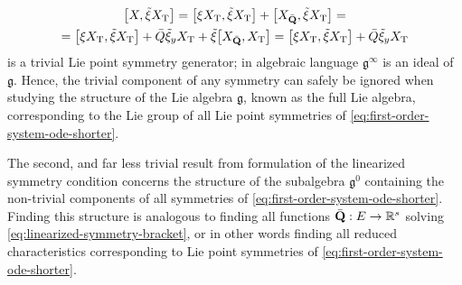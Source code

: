 \begin{multline}
  \comm{X}{\tilde{\xi} X_{\text{T}}} =
  \comm{\xi X_{\text{T}}}{\tilde{\xi} X_{\text{T}}} + \comm{X_{\bar{\vb{Q}}}}{\tilde{\xi} X_{\text{T}}} =\\
  = \comm{\xi X_{\text{T}}}{\tilde{\xi} X_{\text{T}}} + \bar{Q} \tilde{\xi}_y X_{\text{T}} + \tilde{\xi} \comm{X_{\bar{\vb{Q}}}}{X_{\text{T}}} =
  \comm{\xi X_{\text{T}}}{\tilde{\xi} X_{\text{T}}} + \bar{Q} \tilde{\xi}_y X_{\text{T}}
\end{multline}
is a trivial Lie point symmetry generator; in algebraic language \(\mathfrak{g}^\infty\) is an ideal of \(\mathfrak{g}\).
Hence, the trivial component of any symmetry can safely be ignored when studying the structure of the Lie algebra \(\mathfrak{g}\), known as the full Lie algebra, corresponding to the Lie group of all Lie point symmetries of \cref{eq:first-order-system-ode-shorter}.

The second, and far less trivial result from formulation  of the linearized symmetry condition concerns the structure of the subalgebra \(\mathfrak{g}^0\) containing the non-trivial components of all symmetries of \cref{eq:first-order-system-ode-shorter}.
Finding this structure is analogous to finding all functions \(\bar{\vb{Q}}: E \to \mathbb{R}^s\) solving \cref{eq:linearized-symmetry-bracket}, or in other words finding all reduced characteristics corresponding to Lie point symmetries of \cref{eq:first-order-system-ode-shorter}.

